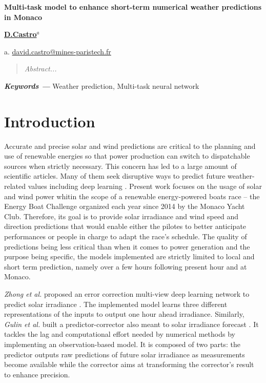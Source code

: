 \documentclass{article}
\providecommand{\keywords}[1]{\textbf{\textit{Keywords ---}} #1}
\newcommand{\saut}{\vspace{10px}}
\begin{document}
\begin{center}
    \begin{Large}\textbf{Multi-task model to enhance short-term numerical weather predictions in Monaco}\end{Large}
    
    \vspace{1cm}
    \begin{large}\textbf{\underline{D.Castro$^a$}}\end{large}
    
    \vspace{0.5cm}
    a. \href{mailto:david.castro@mines-paristech.fr}{david.castro@mines-paristech.fr}
    \vspace{1cm}
\end{center}

\begin{abstract}
\textit{Abstract...}
\end{abstract}

\saut

\keywords{Weather prediction, Multi-task neural network}

\section{Introduction}

Accurate and precise solar and wind predictions are critical to the planning and use of renewable energies so that
power production can switch to dispatchable sources when strictly necessary. This concern has led to a large amount of
scientific articles. Many of them seek disruptive ways to predict future weather-related values including deep learning
\cite{zhong_multi-view_2021}.
Present work focuses on the usage of solar and wind power whitin the scope of a renewable energy-powered boats race
-- the Energy Boat Challenge organized each year since 2014 by the Monaco Yacht Club. Therefore, its goal is to provide
solar irradiance and wind speed and direction predictions that would enable either the pilotes to better anticipate
performances or people in charge to adapt the race's schedule. The quality of predictions being less critical than
when it comes to power generation and the purpose being specific, the models implemented are strictly limited to
local and short term prediction, namely over a few hours following present hour and at Monaco.

\saut

\emph{Zhong et al.} proposed an error correction multi-view deep learning network to predict
solar irradiance \cite{zhong_multi-view_2021}. The implemented model learns three different representations of the inputs 
to output one hour ahead irradiance. Similarly, \emph{Gulin et al.} built a predictor-corrector also meant to solar irradiance
forecast \cite{gulin_predictor-corrector_2015}. It tackles the lag and computational effort needed by numerical methods by implementing an observation-based model. It is composed of two parts: the predictor outputs raw
predictions of future solar irradiance as measurements become available while the corrector aims at transforming
the corrector's result to enhance precision.
\end{document}
